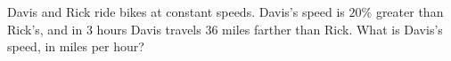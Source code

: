Davis and Rick ride bikes at constant speeds. Davis's speed is $20\%$ greater than Rick's, and in $3$ hours Davis travels $36$ miles farther than Rick. What is Davis's speed, in miles per hour?
